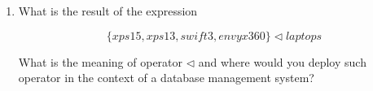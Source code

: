 \documentclass[12pt]{article}
\begin{document}
\begin{itemize}
\begin{enumerate}
                        \begin{itemize}
                              \item The domain is defined as:  %
                                    \[
                                          \dom laptops = \\
                                          \hspace{5mm} \{ \\
                                          \hspace{10mm} legion5,\\
                                          \hspace{10mm} macbookair,\\
                                          \hspace{10mm} xps15,\\
                                          \hspace{10mm} spectre,\\
                                          \hspace{10mm} xps13,\\
                                          \hspace{10mm} swift3,\\
                                          \hspace{10mm} macbookpro,\\
                                          \hspace{10mm} dragonfly,\\
                                          \hspace{10mm} envyx360\\
                                          \hspace{5mm} \}
                                    \]


                              \item The range is defined as:  $\ran~laptops = \{ lenovo, apple, dell, hp, acer \}$.


                        \end{itemize}


                  \item What is the result of the expression

                        \[ \{ xps15, xps13, swift3, envyx360 \}  \lhd laptops \]

                        \noindent What is the meaning of operator $\lhd$ and where would you deploy such operator in the context of a database management system?


\end{enumerate}
\end{itemize}
\end{document}
